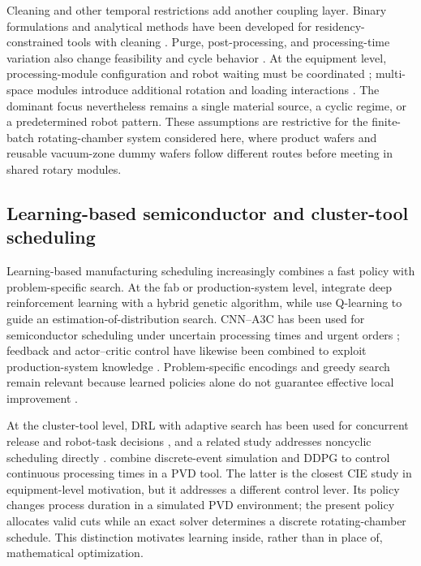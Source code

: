 \documentclass[preprint,12pt,authoryear]{elsarticle}
\begin{document}
Cleaning and other temporal restrictions add another coupling layer.
Binary formulations and analytical methods have been developed for
residency-constrained tools with cleaning
\citep{qiao2022binary,li2022conditioncleaning,lee2023cleaningplan}.
Purge, post-processing, and processing-time variation also change feasibility
and cycle behavior
\citep{yuan2023purge,zhu2023postprocess,pan2024cycletime}. At the equipment
level, processing-module configuration and robot waiting must be coordinated
\citep{wang2023optimalcyclic}; multi-space modules introduce additional
rotation and loading interactions \citep{zou2024twospace,gu2024multifinger}.
The dominant focus nevertheless remains a single material source, a cyclic
regime, or a predetermined robot pattern. These assumptions are restrictive
for the finite-batch rotating-chamber system considered here, where product wafers and
reusable vacuum-zone dummy wafers follow different routes before meeting in shared rotary modules.

\subsection{Learning-based semiconductor and cluster-tool scheduling}

Learning-based manufacturing scheduling increasingly combines a fast policy
with problem-specific search. At the fab or production-system level,
\citet{chien2021drlhga} integrate deep reinforcement learning with a hybrid
genetic algorithm, while \citet{zhang2024qeda} use Q-learning to guide an
estimation-of-distribution search. CNN--A3C has been used for semiconductor
scheduling under uncertain processing times and urgent orders
\citep{liu2022cnna3c}; feedback and actor--critic control have likewise been
combined to exploit production-system knowledge
\citep{li2022hybridfeedback}. Problem-specific encodings and greedy search
remain relevant because learned policies alone do not guarantee effective
local improvement \citep{hu2023crowsearch}.

At the cluster-tool level, DRL with adaptive search has been used for
concurrent release and robot-task decisions
\citep{kim2025adaptivecluster}, and a related study addresses noncyclic
scheduling directly \citep{kim2025noncyclic}. \citet{hong2026ddpgct} combine
discrete-event simulation and DDPG to control continuous processing times in
a PVD tool. The latter is the closest CIE study in equipment-level motivation,
but it addresses a different control lever. Its policy changes process
duration in a simulated PVD environment; the present policy allocates valid
cuts while an exact solver determines a discrete rotating-chamber schedule. This
distinction motivates learning inside, rather than in place of, mathematical
optimization.
\end{document}
